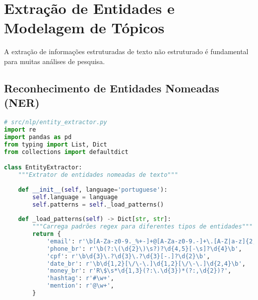 \section{Extração de Entidades e Modelagem de Tópicos}

A extração de informações estruturadas de texto não estruturado é fundamental para muitas análises de pesquisa.

\subsection{Reconhecimento de Entidades Nomeadas (NER)}

\begin{pythonbox}
\begin{lstlisting}[language=Python]
# src/nlp/entity_extractor.py
import re
import pandas as pd
from typing import List, Dict
from collections import defaultdict

class EntityExtractor:
    """Extrator de entidades nomeadas de texto"""
    
    def __init__(self, language='portuguese'):
        self.language = language
        self.patterns = self._load_patterns()
        
    def _load_patterns(self) -> Dict[str, str]:
        """Carrega padrões regex para diferentes tipos de entidades"""
        return {
            'email': r'\b[A-Za-z0-9._%+-]+@[A-Za-z0-9.-]+\.[A-Z|a-z]{2,}\b',
            'phone_br': r'\b(?:\(\d{2}\)\s?)?\d{4,5}[-\s]?\d{4}\b',
            'cpf': r'\b\d{3}\.?\d{3}\.?\d{3}[-.]?\d{2}\b',
            'date_br': r'\b\d{1,2}[\/\-\.]\d{1,2}[\/\-\.]\d{2,4}\b',
            'money_br': r'R\$\s*\d{1,3}(?:\.\d{3})*(?:,\d{2})?',
            'hashtag': r'#\w+',
            'mention': r'@\w+',
        }
        \end{lstlisting}
\end{pythonbox}

